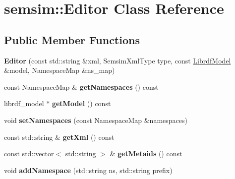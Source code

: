 \hypertarget{classsemsim_1_1Editor}{}\section{semsim\+:\+:Editor Class Reference}
\label{classsemsim_1_1Editor}
\subsection*{Public Member Functions}
\begin{DoxyCompactItemize}
\item 
\mbox{\label{classsemsim_1_1Editor_a527bb8490d00cc99bd6858df70b12245}} 
{\bfseries Editor} (const std\+::string \&xml, Semsim\+Xml\+Type type, const \hyperlink{classredland_1_1LibrdfModel}{Librdf\+Model} \&model, Namespace\+Map \&ns\+\_\+map)
\item 
\mbox{\label{classsemsim_1_1Editor_a41935516eed7c1a74d867c7d9001b9d9}} 
const Namespace\+Map \& {\bfseries get\+Namespaces} () const
\item 
\mbox{\label{classsemsim_1_1Editor_aa645892f004f1de4aa841cecba5c26e9}} 
librdf\+\_\+model $\ast$ {\bfseries get\+Model} () const
\item 
\mbox{\label{classsemsim_1_1Editor_aa67799c71119627bf2eb149777926619}} 
void {\bfseries set\+Namespaces} (const Namespace\+Map \&namespaces)
\item 
\mbox{\label{classsemsim_1_1Editor_ac44d2a14cc890ab502897b8147d6a7f0}} 
const std\+::string \& {\bfseries get\+Xml} () const
\item 
\mbox{\label{classsemsim_1_1Editor_a442a53c7f01042a82307f161a9fb39aa}} 
const std\+::vector$<$ std\+::string $>$ \& {\bfseries get\+Metaids} () const
\item 
\mbox{\label{classsemsim_1_1Editor_ac9f7e88c9d94e7f557e0447de9bb80a1}} 
void {\bfseries add\+Namespace} (std\+::string ns, std\+::string prefix)
\item 
\mbox{\label{classsemsim_1_1Editor_a52f9cf039194b8aa64a56737398ce158}} 

\end{DoxyCompactItemize}
